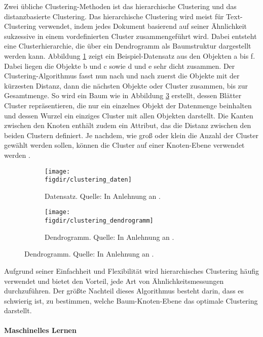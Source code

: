 Zwei übliche Clustering-Methoden ist das hierarchische Clustering und das distanzbasierte Clustering. Das hierarchische Clustering wird meist für Text-Clustering verwendet, indem jedes Dokument basierend auf seiner Ähnlichkeit sukzessive in einem vordefinierten Cluster zusammengeführt wird. Dabei entsteht eine Clusterhierarchie, die über ein Dendrogramm als Baumstruktur dargestellt werden kann. Abbildung \ref{f:clustering_daten} zeigt ein Beispiel-Datensatz aus den Objekten a bis f. Dabei liegen die Objekte b und c sowie d und e sehr dicht zusammen. Der Clustering-Algorithmus fasst nun nach und nach zuerst die Objekte mit der kürzesten Distanz, dann die nächsten Objekte oder Cluster zusammen, bis zur Gesamtmenge. So wird ein Baum wie in Abbildung \ref{f:clustering_baum} erstellt, dessen Blätter Cluster repräsentieren, die nur ein einzelnes Objekt der Datenmenge beinhalten und dessen Wurzel ein einziges Cluster mit allen Objekten darstellt. Die Kanten zwischen den Knoten enthält zudem ein Attribut, das die Distanz zwischen den beiden Clustern definiert. Je nachdem, wie groß oder klein die Anzahl der Cluster gewählt werden sollen, können die Cluster auf einer Knoten-Ebene verwendet werden \cite{Suyal.2014}.

\begin{figure}[htbp]
    \centering
    \begin{subfigure}[b]{0.47\linewidth}
        \texttt{[image: \\figdir/clustering\_daten]}
        \caption{Datensatz. Quelle: In Anlehnung an \cite{Bonthu.2023}.}
        \label{f:clustering_daten}
    \end{subfigure}
    \hfill
    \begin{subfigure}[b]{0.47\linewidth}
        \texttt{[image: \\figdir/clustering\_dendrogramm]}
        \caption{Dendrogramm. Quelle: In Anlehnung an \cite{Bonthu.2023}.}
        \label{f:clustering_baum}
    \end{subfigure}
\end{figure}

Aufgrund seiner Einfachheit und Flexibilität wird hierarchisches Clustering häufig verwendet und bietet den Vorteil, jede Art von Ähnlichkeitsmessungen durchzuführen. Der größte Nachteil dieses Algorithmus besteht darin, dass es schwierig ist, zu bestimmen, welche Baum-Knoten-Ebene das optimale Clustering darstellt.


\paragraph{Maschinelles Lernen}

